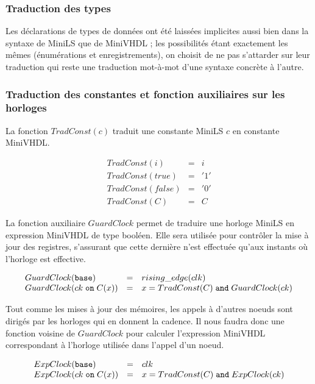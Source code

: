 \documentclass[a4paper]{article}
\newcommand{\minils}{{\sc MiniLS}}
\newcommand{\minivhdl}{{\sc MiniVHDL}}
\newcommand{\mybox}[1]{\mbox{\tt{#1}}}
\newcommand{\Base}[0]{\mybox{base}}
\newcommand{\On}[3]{#1 \; \mybox{on} \; #2 (#3)}
\begin{document}
\subsubsection{Traduction des types}

Les déclarations de types de données ont été laissées implicites aussi bien dans
la syntaxe de \minils{} que de \minivhdl{} ; les possibilités étant exactement les
mêmes (énumérations et enregistrements), on choisit de ne pas s'attarder sur
leur traduction qui reste une traduction mot-à-mot d'une syntaxe concrète à
l'autre.

\subsubsection{Traduction des constantes et fonction auxiliaires sur les horloges}

La fonction $TradConst(c)$ traduit une constante \minils{} $c$ en constante
\minivhdl{}.

\newcommand{\TradC}[1]{TradConst(#1)}

\[
\begin{array}{lcl}
  \TradC{i} & = & i \\
  \TradC{true} & = & '1' \\
  \TradC{false} & = & '0' \\
  \TradC{C} & = & C
\end{array}
\]

La fonction auxiliaire $GuardClock$ permet de traduire une horloge \minils{} en
expression \minivhdl{} de type booléen. Elle sera utilisée pour contrôler la
mise à jour des registres, s'assurant que cette dernière n'est effectuée
qu'aux instants où l'horloge est effective.

\newcommand{\GEC}[1]{GuardClock(#1)}

\[
\begin{array}{lcl}
  \GEC{\Base} & = & rising\_edge(clk) \\
  \GEC{\On{ck}{C}{x}} & = & x = \TradC{C} \; \mathtt{and} \; \GEC{ck}
\end{array}
\]

Tout comme les mises à jour des mémoires, les appels à d'autres noeuds
sont dirigés par les horloges qui en donnent la cadence. Il nous faudra donc
une fonction voisine de $GuardClock$ pour calculer l'expression \minivhdl{}
correspondant à l'horloge utilisée dans l'appel d'un noeud.

\newcommand{\EC}[1]{ExpClock(#1)}

\[
\begin{array}{lcl}
  \EC{\Base} & = & clk \\
  \EC{\On{ck}{C}{x}} & = & x = \TradC{C} \; \mathtt{and} \; \EC{ck}
\end{array}
\]
\end{document}
